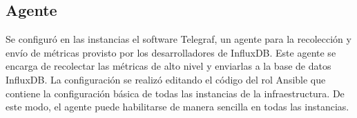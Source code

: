 \subsection{Agente}

Se configuró en las instancias el software Telegraf, un agente para la
recolección y envío de métricas provisto por los desarrolladores de
InfluxDB. Este agente se encarga de recolectar las métricas de alto
nivel y enviarlas a la base de datos InfluxDB. La configuración se
realizó editando el código del rol Ansible que contiene la
configuración básica de todas las instancias de la infraestructura. De
este modo, el agente puede habilitarse de manera sencilla en todas las
instancias.

